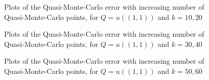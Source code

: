 \begin{figure}[h]
    \centering
  \begin{subfigure}{0.45\textwidth}

  \end{subfigure}
    \begin{subfigure}{0.45\textwidth}

    \end{subfigure}
\caption{Plots of the Quasi-Monte-Carlo error with increasing number of Quasi-Monte-Carlo points, for $Q=u((1,1))$ and $k=10,20$ \label{fig:qmctop_right1020}}
\end{figure}
\begin{figure}[h]
    \centering
  \begin{subfigure}{0.45\textwidth}

  \end{subfigure}
    \begin{subfigure}{0.45\textwidth}

    \end{subfigure}
\caption{Plots of the Quasi-Monte-Carlo error with increasing number of Quasi-Monte-Carlo points, for $Q=u((1,1))$ and $k=30,40$ \label{fig:qmctop_right3040}}
\end{figure}
\begin{figure}[h]
    \centering
  \begin{subfigure}{0.45\textwidth}

  \end{subfigure}
    \begin{subfigure}{0.45\textwidth}

    \end{subfigure}
\caption{Plots of the Quasi-Monte-Carlo error with increasing number of Quasi-Monte-Carlo points, for $Q=u((1,1))$ and $k=50,60$ \label{fig:qmctop_right5060}}
\end{figure}


